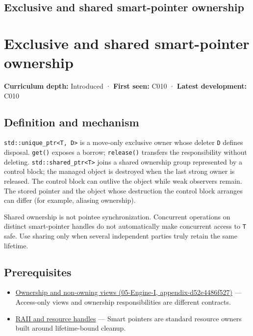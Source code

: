 \hypertarget{appendix-51602cabe815}{}
\section*{Exclusive and shared smart-pointer ownership}
\chapter{Exclusive and shared smart-pointer ownership}\label{appendix-51602cabe815-exclusive-and-shared-smart-pointer-ownership}

\textbf{Curriculum depth:} Introduced · \textbf{First seen:} C010 · \textbf{Latest development:} C010

\section{Definition and mechanism}\label{appendix-51602cabe815-definition-and-mechanism}

\texttt{std::unique\_ptr\textless{}T,\ D\textgreater{}} is a move-only exclusive owner whose deleter \texttt{D} defines disposal. \texttt{get()} exposes a borrow; \texttt{release()} transfers the responsibility without deleting. \texttt{std::shared\_ptr\textless{}T\textgreater{}} joins a shared ownership group represented by a control block; the managed object is destroyed when the last strong owner is released. The control block can outlive the object while weak observers remain. The stored pointer and the object whose destruction the control block arranges can differ (for example, aliasing ownership).

Shared ownership is not pointee synchronization. Concurrent operations on distinct smart-pointer handles do not automatically make concurrent access to \texttt{T} safe. Use sharing only when several independent parties truly retain the same lifetime.

\section{Prerequisites}\label{appendix-51602cabe815-prerequisites}

\begin{itemize}
\tightlist
\item
  \href{../05-Engine-I/main.pdf\#nameddest=appendix-d52e4486f527}{Ownership and non-owning views (05-Engine-I, appendix-d52e4486f527)} --- Access-only views and ownership responsibilities are different contracts.
\item
  \hyperref[appendix-69739d3ab49b]{RAII and resource handles} --- Smart pointers are standard resource owners built around lifetime-bound cleanup.
\end{itemize}

